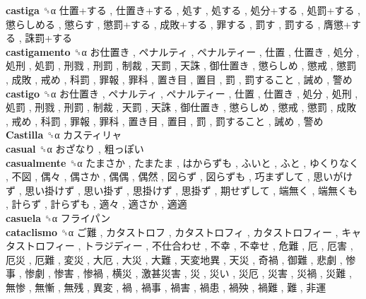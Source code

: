 \textbf{castiga} ␝α   仕置+する ,  仕置き+する ,  処す ,  処する ,  処分+する ,  処罰+する ,  懲らしめる ,  懲らす ,  懲罰+する ,  成敗+する ,  罪する ,  罰す ,  罰する ,  膺懲+する ,  誅罰+する   \\
\textbf{castigamento} ␝α   お仕置き ,  ペナルティ ,  ペナルティー ,  仕置 ,  仕置き ,  処分 ,  処刑 ,  処罰 ,  刑戮 ,  刑罰 ,  制裁 ,  天罰 ,  天誅 ,  御仕置き ,  懲らしめ ,  懲戒 ,  懲罰 ,  成敗 ,  戒め ,  科罰 ,  罪報 ,  罪科 ,  置き目 ,  置目 ,  罰 ,  罰すること ,  誡め ,  警め   \\
\textbf{castigo} ␝α   お仕置き ,  ペナルティ ,  ペナルティー ,  仕置 ,  仕置き ,  処分 ,  処刑 ,  処罰 ,  刑戮 ,  刑罰 ,  制裁 ,  天罰 ,  天誅 ,  御仕置き ,  懲らしめ ,  懲戒 ,  懲罰 ,  成敗 ,  戒め ,  科罰 ,  罪報 ,  罪科 ,  置き目 ,  置目 ,  罰 ,  罰すること ,  誡め ,  警め   \\
\textbf{Castilla} ␝α   カスティリャ   \\
\textbf{casual} ␝α   おざなり ,  粗っぽい   \\
\textbf{casualmente} ␝α   たまさか ,  たまたま ,  はからずも ,  ふいと ,  ふと ,  ゆくりなく ,  不図 ,  偶々 ,  偶さか ,  偶偶 ,  偶然 ,  図らず ,  図らずも ,  巧まずして ,  思いがけず ,  思い掛けず ,  思い掛ず ,  思掛けず ,  思掛ず ,  期せずして ,  端無く ,  端無くも ,  計らず ,  計らずも ,  適々 ,  適さか ,  適適   \\
\textbf{casuela} ␝α   フライパン   \\
\textbf{cataclismo} ␝α   ご難 ,  カタストロフ ,  カタストロフィ ,  カタストロフィー ,  キャタストロフィー ,  トラジディー ,  不仕合わせ ,  不幸 ,  不幸せ ,  危難 ,  厄 ,  厄害 ,  厄災 ,  厄難 ,  変災 ,  大厄 ,  大災 ,  大難 ,  天変地異 ,  天災 ,  奇禍 ,  御難 ,  悲劇 ,  惨事 ,  惨劇 ,  惨害 ,  惨禍 ,  横災 ,  激甚災害 ,  災 ,  災い ,  災厄 ,  災害 ,  災禍 ,  災難 ,  無惨 ,  無慚 ,  無残 ,  異変 ,  禍 ,  禍事 ,  禍害 ,  禍患 ,  禍殃 ,  禍難 ,  難 ,  非運   \\
